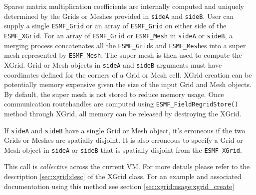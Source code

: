     Sparse matrix multiplication coefficients are internally computed and
    uniquely determined by the Grids or Meshes provided in {\tt sideA} and {\tt sideB}. User can supply
    a single {\tt ESMF\_Grid} or an array of {\tt ESMF\_Grid} on either side of the 
    {\tt ESMF\_XGrid}. For an array of {\tt ESMF\_Grid} or {\tt ESMF\_Mesh} in {\tt sideA} or {\tt sideB},
    a merging process concatenates all the {\tt ESMF\_Grid}s and {\tt ESMF\_Mesh}es 
    into a super mesh represented
    by {\tt ESMF\_Mesh}. The super mesh is then used to compute the XGrid. 
    Grid or Mesh objects in {\tt sideA} and {\tt sideB} arguments must have coordinates defined for
    the corners of a Grid or Mesh cell. XGrid creation can be potentially memory expensive given the
    size of the input Grid and Mesh objects. By default, the super mesh is not stored
    to reduce memory usage. 
    Once communication routehandles are computed using {\tt ESMF\_FieldRegridStore()} method through
    XGrid, all memory can be released by destroying the XGrid.
   
    If {\tt sideA} and {\tt sideB} have a single 
    Grid or Mesh object, it's erroneous
    if the two Grids or Meshes are spatially disjoint. 
    It is also erroneous to specify a Grid or Mesh object in {\tt sideA} or {\tt sideB}
    that is spatially disjoint from the {\tt ESMF\_XGrid}. 
  
    This call is {\em collective} across the current VM. For more details please refer to the description 
    \ref{sec:xgrid:desc} of the XGrid class. For an example and associated documentation using this method see section 
    \ref{sec:xgrid:usage:xgrid_create}
 
